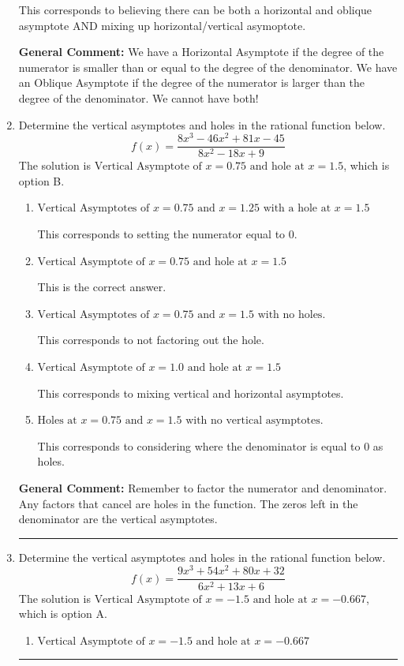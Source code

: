 \documentclass{extbook}[14pt]
\newcommand{\litem}[1]{\item #1

\rule{\textwidth}{0.4pt}}
\begin{document}
\begin{enumerate}
{\begin{enumerate}[label=\Alph*.]
This corresponds to believing there can be both a horizontal and oblique asymptote AND mixing up horizontal/vertical asymoptote.
\end{enumerate}

\textbf{General Comment:} We have a Horizontal Asymptote if the degree of the numerator is smaller than or equal to the degree of the denominator. We have an Oblique Asymptote if the degree of the numerator is larger than the degree of the denominator. We cannot have both!
}
\litem{
Determine the vertical asymptotes and holes in the rational function below.
\[ f(x) = \frac{8x^{3} -46 x^{2} +81 x -45}{8x^{2} -18 x + 9} \]The solution is \( \text{Vertical Asymptote of } x = 0.75 \text{ and hole at } x = 1.5 \), which is option B.\begin{enumerate}[label=\Alph*.]
\item \( \text{Vertical Asymptotes of } x = 0.75 \text{ and } x = 1.25 \text{ with a hole at } x = 1.5 \)

This corresponds to setting the numerator equal to 0.
\item \( \text{Vertical Asymptote of } x = 0.75 \text{ and hole at } x = 1.5 \)

This is the correct answer.
\item \( \text{Vertical Asymptotes of } x = 0.75 \text{ and } x = 1.5 \text{ with no holes.} \)

This corresponds to not factoring out the hole.
\item \( \text{Vertical Asymptote of } x = 1.0 \text{ and hole at } x = 1.5 \)

This corresponds to mixing vertical and horizontal asymptotes.
\item \( \text{Holes at } x = 0.75 \text{ and } x = 1.5 \text{ with no vertical asymptotes.} \)

This corresponds to considering where the denominator is equal to 0 as holes.
\end{enumerate}

\textbf{General Comment:} Remember to factor the numerator and denominator. Any factors that cancel are holes in the function. The zeros left in the denominator are the vertical asymptotes.
}
\litem{
Determine the vertical asymptotes and holes in the rational function below.
\[ f(x) = \frac{9x^{3} +54 x^{2} +80 x + 32}{6x^{2} +13 x + 6} \]The solution is \( \text{Vertical Asymptote of } x = -1.5 \text{ and hole at } x = -0.667 \), which is option A.\begin{enumerate}[label=\Alph*.]
\item \( \text{Vertical Asymptote of } x = -1.5 \text{ and hole at } x = -0.667 \)


\end{enumerate}}
\end{enumerate}
\end{document}
